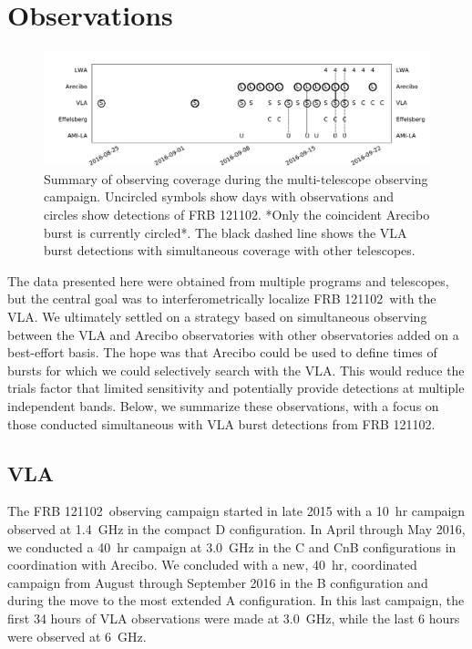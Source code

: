 \documentclass{emulateapj}
\newcommand{\frb}{FRB 121102}
\begin{document}
\section{Observations}
\begin{figure}[t]
\begin{center}
\includegraphics[width=2\columnwidth]{timeline}
\caption{Summary of observing coverage during the multi-telescope observing campaign. Uncircled symbols show days with observations and circles show detections of \frb. *Only the coincident Arecibo burst is currently circled*. The black dashed line shows the VLA burst detections with simultaneous coverage with other telescopes.
\label{fig:multi}}
\end{center}
\end{figure}

The data presented here were obtained from multiple programs and telescopes, but the central goal was to interferometrically localize \frb\ with the VLA. We ultimately settled on a strategy based on simultaneous observing between the VLA and Arecibo observatories with other observatories added on a best-effort basis. The hope was that Arecibo could be used to define times of bursts for which we could selectively search with the VLA. This would reduce the trials factor that limited sensitivity and potentially provide detections at multiple independent bands. Below, we summarize these observations, with a focus on those conducted simultaneous with VLA burst detections from \frb.

\subsection{VLA}
The \frb\ observing campaign started in late 2015 with a 10~hr campaign observed at 1.4~GHz in the compact D configuration. In April through May 2016, we conducted a 40~hr campaign at 3.0~GHz in the C and CnB configurations in coordination with Arecibo. We concluded with a new, 40~hr, coordinated campaign from August through September 2016 in the B configuration and during the move to the most extended A configuration. In this last campaign, the first 34 hours of VLA observations were made at 3.0~GHz, while the last 6 hours were observed at 6~GHz.
\end{document}
